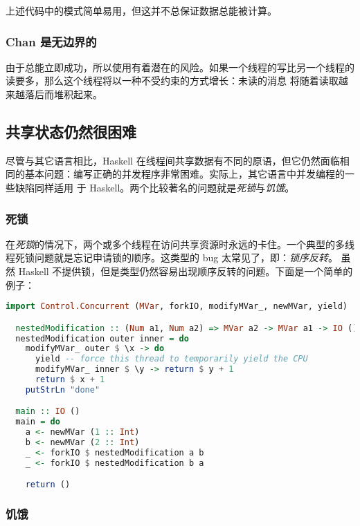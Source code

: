 \documentclass[./main.tex]{subfiles}
\begin{document}
上述代码中的\acode{!}模式简单易用，但这并不总保证数据总能被计算。

\subsubsection*{Chan 是无边界的}

由于总能立即成功，所以使用有着潜在的风险。如果一个线程的写比另一个线程的读要多，那么这个线程将以一种不受约束的方式增长：未读的消息
将随着读取越来越落后而堆积起来。

\subsection*{共享状态仍然很困难}

尽管与其它语言相比，Haskell 在线程间共享数据有不同的原语，但它仍然面临相同的基本问题：编写正确的并发程序非常困难。实际上，其它语言中并发编程的一些缺陷同样适用
于 Haskell。两个比较著名的问题就是\textit{死锁}与\textit{饥饿}。

\subsubsection*{死锁}

在\textit{死锁}的情况下，两个或多个线程在访问共享资源时永远的卡住。一个典型的多线程死锁问题就是忘记申请锁的顺序。这类型的 bug 太常见了，即：\textit{锁序反转}。
虽然 Haskell 不提供锁，但是类型仍然容易出现顺序反转的问题。下面是一个简单的例子：

\begin{lstlisting}[language=Haskell]
  import Control.Concurrent (MVar, forkIO, modifyMVar_, newMVar, yield)

  nestedModification :: (Num a1, Num a2) => MVar a2 -> MVar a1 -> IO ()
  nestedModification outer inner = do
    modifyMVar_ outer $ \x -> do
      yield -- force this thread to temporarily yield the CPU
      modifyMVar_ inner $ \y -> return $ y + 1
      return $ x + 1
    putStrLn "done"

  main :: IO ()
  main = do
    a <- newMVar (1 :: Int)
    b <- newMVar (2 :: Int)
    _ <- forkIO $ nestedModification a b
    _ <- forkIO $ nestedModification b a

    return ()
\end{lstlisting}

%

\subsubsection*{饥饿}
\end{document}
